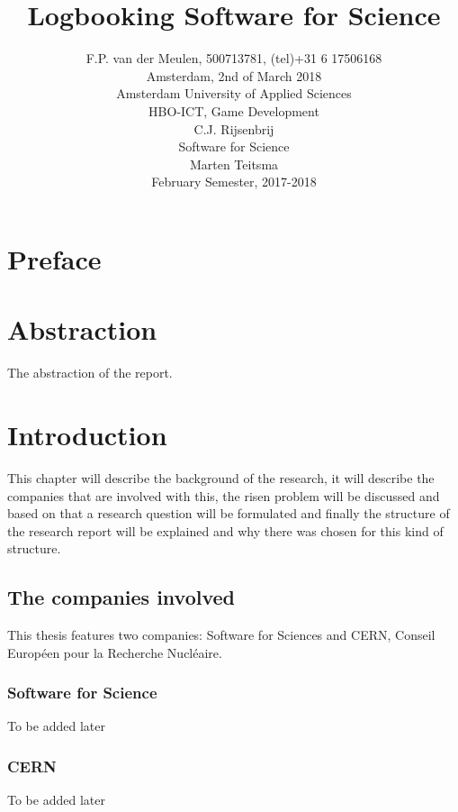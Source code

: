 \documentclass[paper=a4, fontsize=11pt,twoside]{scrartcl}	%
\title{Logbooking Software for Science}
\author{
		F.P. van der Meulen, 500713781, (tel)+31 6 17506168\\
		Amsterdam, 2nd of March 2018\\	
		Amsterdam University of Applied Sciences\\
		HBO-ICT, Game Development\\
		C.J. Rijsenbrij\\	
		Software for Science\\
		Marten Teitsma\\
		February Semester, 2017-2018\\
}
\makeatletter
\def\printtitle{%
    {\centering \@title\par}}
\def\printauthor{%
    {\centering \large \@author}}
\makeatother
\begin{document}
\thispagestyle{empty}		%


\maketitle


\newpage 
\printauthor

\newpage



\newpage
\tableofcontents

\newpage
\section{Preface}


\section{Abstraction}
The abstraction of the report.
\newpage
\section{Introduction}
This chapter will describe the background of the research, it will describe the companies that are involved with this, the risen problem will be discussed and based on that a research question will be formulated and finally the structure of the research report will be explained and why there was chosen for this kind of structure. \\

\subsection{The companies involved}
This thesis features two companies: Software for Sciences and CERN, Conseil Européen pour la Recherche Nucléaire. 
\subsubsection{Software for Science}
To be added later
\subsubsection{CERN}
To be added later
\end{document}
